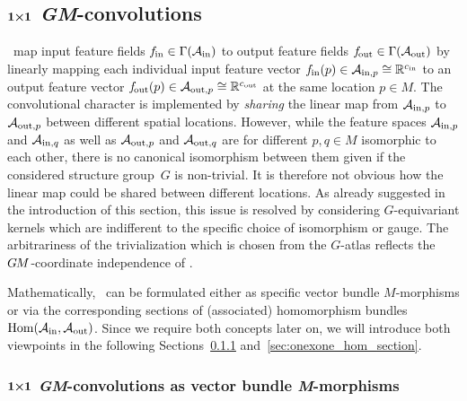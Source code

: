 

\subsection[\texorpdfstring{${1\kern-2.7pt\times\kern-2.9pt1}$}{1x1} \textit{GM}-convolutions]%
           {\texorpdfstring{$\bm{1\kern-2.7pt\times\kern-2.9pt1}$}{1x1} \textit{GM}-convolutions}
\label{sec:onexone}


\onexoneGMs\ map input feature fields $f_\textup{\;\!\!in}\in\Gamma(\mathcal{A}_\textup{in})$ to output feature fields $f_\textup{\:\!\!out}\in\Gamma(\mathcal{A}_\textup{out})$ by linearly mapping each individual input feature vector $f_\textup{\;\!\!in}(p)\in\mathcal{A}_{\textup{in},p}\cong\mathbb{R}^{{c_\textup{in}}}$ to an output feature vector $f_\textup{\:\!\!out}(p)\in\mathcal{A}_{\textup{out},p}\cong\mathbb{R}^{{c_\textup{out}}}$ at the same location $p\in M$.
The convolutional character is implemented by \emph{sharing} the linear map from $\mathcal{A}_{\textup{in},p}$ to $\mathcal{A}_{\textup{out},p}$ between different spatial locations.
However, while the feature spaces $\mathcal{A}_{\textup{in},p}$ and $\mathcal{A}_{\textup{in},q}$ as well as $\mathcal{A}_{\textup{out},p}$ and $\mathcal{A}_{\textup{out},q}$ are for different $p,q\in M$ isomorphic to each other, there is no canonical isomorphism between them given if the considered structure group~$G$ is non-trivial.
It is therefore not obvious how the linear map could be shared between different locations.
As already suggested in the introduction of this section, this issue is resolved by considering $G$-equivariant kernels which are indifferent to the specific choice of isomorphism or gauge.
The arbitrariness of the trivialization which is chosen from the $G$-atlas reflects the $G\mkern-1.4muM$-coordinate independence of \onexoneGMs.


Mathematically, \onexoneGMs\ can be formulated either as specific vector bundle $M$-morphisms or via the corresponding sections of (associated) homomorphism bundles $\operatorname{Hom}(\mathcal{A}_\textup{in},\mathcal{A}_\textup{out})$.
Since we require both concepts later on, we will introduce both viewpoints in the following Sections~\ref{sec:onexone_M_morphism} and~\ref{sec:onexone_hom_section}.


\subsubsection[\texorpdfstring{${1\kern-2.7pt\times\kern-2.9pt1}$}{1x1} \textit{GM}-convolutions as vector bundle \textit{M}-morphisms]%
              {\texorpdfstring{$\bm{1\kern-2.7pt\times\kern-2.9pt1}$}{1x1} \textit{GM}-convolutions as vector bundle \textit{M}-morphisms}
\label{sec:onexone_M_morphism}



